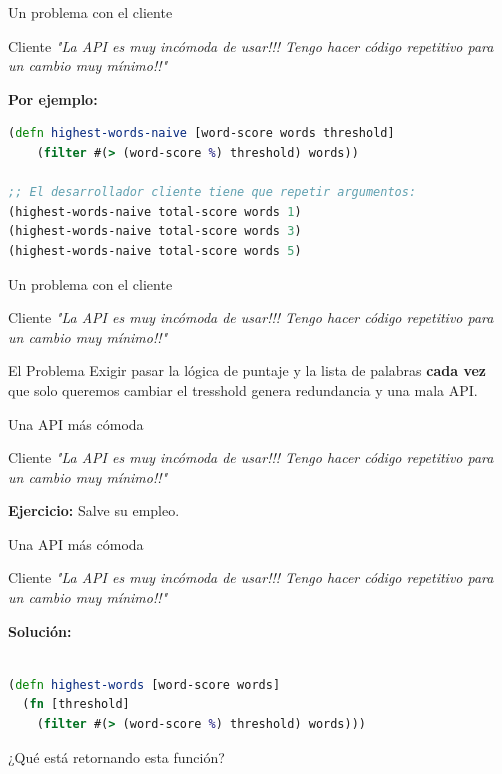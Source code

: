 \documentclass{beamer}
\begin{document}
\begin{frame}[fragile]{Un problema con el cliente}
    \begin{exampleblock}{Cliente}
        \textit{"La API es muy incómoda de usar!!! Tengo hacer código repetitivo para un cambio muy mínimo!!"}
    \end{exampleblock}

    \textbf{Por ejemplo:}
    \begin{lstlisting}[language=Clojure]
(defn highest-words-naive [word-score words threshold]
    (filter #(> (word-score %) threshold) words))

;; El desarrollador cliente tiene que repetir argumentos:
(highest-words-naive total-score words 1)
(highest-words-naive total-score words 3)
(highest-words-naive total-score words 5)
    \end{lstlisting}
\end{frame}


\begin{frame}[fragile]{Un problema con el cliente}
    \begin{exampleblock}{Cliente}
        \textit{"La API es muy incómoda de usar!!! Tengo hacer código repetitivo para un cambio muy mínimo!!"}
    \end{exampleblock}

    \begin{alertblock}{El Problema}
        Exigir pasar la lógica de puntaje y la lista de palabras \textbf{cada vez} que solo queremos cambiar el tresshold genera redundancia y una mala API.
    \end{alertblock}
\end{frame}

\begin{frame}[fragile]{Una API más cómoda}
    \begin{exampleblock}{Cliente}
        \textit{"La API es muy incómoda de usar!!! Tengo hacer código repetitivo para un cambio muy mínimo!!"}
    \end{exampleblock}

    \textbf{Ejercicio:} Salve su empleo.
\end{frame}

\begin{frame}[fragile]{Una API más cómoda}
    \begin{exampleblock}{Cliente}
        \textit{"La API es muy incómoda de usar!!! Tengo hacer código repetitivo para un cambio muy mínimo!!"}
    \end{exampleblock}

    \textbf{Solución:}

    \begin{lstlisting}[language=Clojure]

(defn highest-words [word-score words]
  (fn [threshold]
    (filter #(> (word-score %) threshold) words)))
    \end{lstlisting}

    ¿Qué está retornando esta función?
\end{frame}
\end{document}
